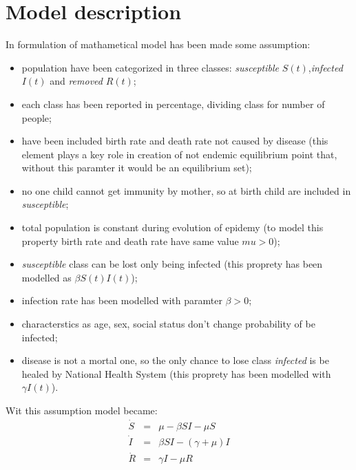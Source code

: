 \section{Model description}
In formulation of mathametical model has been made some assumption:

\begin{itemize}
    \item population have been categorized in three classes: \textit{susceptible} $S(t)$,\textit{infected} $I(t)$ and \textit{removed} $R(t)$;
    
    \item each class has been reported in percentage, dividing class for number of people;
    
    \item have been included birth rate and death rate not caused by disease (this element plays a key role in creation of not endemic equilibrium point that, without this paramter it would be an equilibrium set);
    
    \item no one child cannot get immunity by mother, so at birth child are included in \textit{susceptible};
    
    \item total population is constant during evolution of epidemy (to model this property birth rate and death rate have same value $mu > 0$);
    
    \item \textit{susceptible} class can be lost only being infected (this proprety has been modelled as $\beta S(t)I(t)$);
    
    \item infection rate has been modelled with paramter $\beta > 0$;
    
    \item characterstics as age, sex, social status don't change probability of be infected;
    
    \item disease is not a mortal one, so the only chance to lose class \textit{infected} is be healed by National Health System (this proprety has been modelled with $\gamma I(t)$).
    
\end{itemize}

Wit this assumption model became:
\begin{equation}
\label{eq:sir_model}
    \begin{array}{ccc}
         \dot{S} &=&\mu - \beta SI - \mu S\\
         \dot{I} &=&\beta SI - (\gamma + \mu)I\\
         \dot{R} &=&\gamma I - \mu R
    \end{array}
\end{equation}

